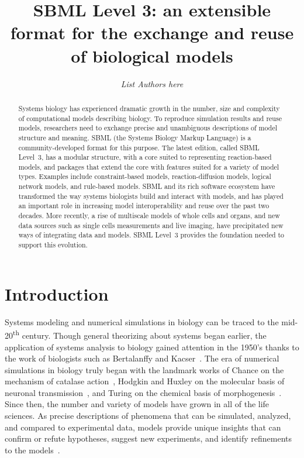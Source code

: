 \documentclass[]{draft-sbml-paper}
\title{SBML Level 3: an extensible format for the exchange and reuse of biological models}
\author[1]{\emph{List Authors here}}
\begin{document}
\maketitle

\begin{abstract}
Systems biology has experienced dramatic growth in the number, size and complexity of computational models describing biology. To reproduce simulation results and reuse models, researchers need to exchange precise and unambiguous descriptions of model structure and meaning. SBML (the Systems Biology Markup Language) is a community-developed format for this purpose. The latest edition, called SBML Level~3, has a modular structure, with a core suited to representing reaction-based models, and packages that extend the core with features suited for a variety of model types. Examples include constraint-based models, reaction-diffusion models, logical network models, and rule-based models. SBML and its rich software ecosystem have transformed the way systems biologists build and interact with models, and has played an important role in increasing model interoperability and reuse over the past two decades. More recently, a rise of multiscale models of whole cells and organs, and new data sources such as single cells measurements and live imaging, have precipitated new ways of integrating data and models. SBML Level~3 provides the foundation needed to support this evolution.
\end{abstract}

\clearpage

\section*{Introduction}

Systems modeling and numerical simulations in biology can be traced to the mid-20\textsuperscript{th} century. Though general theorizing about systems began earlier, the application of systems analysis to biology gained attention in the 1950's thanks to the work of biologists such as Bertalanffy and Kacser~\citep{Von_Bertalanffy1950-dy, Von_Bertalanffy1950-wa, Kacser1957-ox, kell2006theodor}. The era of numerical simulations in biology truly began with the landmark works of Chance on the mechanism of catalase action~\citep{chance1952mechanism}, Hodgkin and Huxley on the molecular basis of neuronal transmission~\citep{hodgkin1952quantitative}, and Turing on the chemical basis of morphogenesis~\citep{turing1990chemical}. Since then, the number and variety of models have grown in all of the life sciences. As precise descriptions of phenomena that can be simulated, analyzed, and compared to experimental data, models provide unique insights that can confirm or refute hypotheses, suggest new experiments, and identify refinements to the models~\citep{Heinrich1996, le_novere_2015}.
\end{document}

